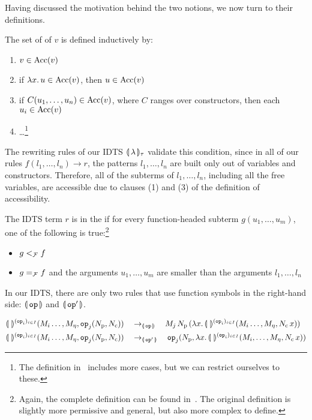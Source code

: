 Having discussed the motivation behind the two notions, we now turn to
their definitions.

\begin{definition}
  The set  of  of $v$ is
  defined inductively by:

  \begin{enumerate}
  \item $v \in \operatorname{Acc}(v)$
  \item if $\lambda x.\, u \in \operatorname{Acc}(v)$, then $u \in \operatorname{Acc}(v)$
  \item if $C(u_1, \ldots, u_n) \in \operatorname{Acc}(v)$, where $C$ ranges over
    constructors, then each $u_i \in \operatorname{Acc}(v)$
  \item \ldots\footnote{The definition in~\cite{blanqui2002inductive}
      includes more cases, but we can restrict ourselves to these.}
  \end{enumerate}
\end{definition}

The rewriting rules of our IDTS ${\llparenthesis \, \lambda \, \rrparenthesis_\tau}$ validate this condition, since in
all of our rules $f(l_1, \ldots, l_n) \to r$, the patterns
$l_1, \ldots, l_n$ are built only out of variables and
constructors. Therefore, all of the subterms of $l_1, \ldots, l_n$,
including all the free variables, are accessible due to clauses (1) and (3)
of the definition of accessibility.

\begin{definition}
  The IDTS term $r$ is in the  if for every function-headed subterm
  $g(u_1, \ldots, u_m)$, one of the following is true:\footnote{Again, the
    complete definition can be found
    in~\cite[p.12]{blanqui2002inductive}. The original definition is
    slightly more permissive and general, but also more complex to define.}

  \begin{itemize}
  \item $g <_{\mathcal{F}} f$
  \item $g =_{\mathcal{F}} f$ and the arguments $u_1, \ldots, u_m$ are smaller than
    the arguments $l_1, \ldots, l_n$
  \end{itemize}
\end{definition}

In our IDTS, there are only two rules that use function symbols in the
right-hand side: $\llparenthesis \, \mathtt{op} \, \rrparenthesis$ and $\llparenthesis \, \mathtt{op}' \, \rrparenthesis$.

\begin{align*}
  \llparenthesis \,  \, \rrparenthesis^{(\mathtt{op}_i)_{i \in I}}(M_i \ldots, M_\eta, \mathtt{op}_j(N_{\mathrm{p}}, N_{\mathrm{c}})) \quad &\to_{\llparenthesis \, \mathtt{op} \, \rrparenthesis} \quad
  M_j\,N_{\mathrm{p}}\,(\lambda x.\, \llparenthesis \,  \, \rrparenthesis^{(\mathtt{op}_i)_{i \in I}}(M_i \ldots, M_\eta, N_{\mathrm{c}}\,x)) \\
  \llparenthesis \,  \, \rrparenthesis^{(\mathtt{op}_i)_{i \in I}}(M_i \ldots, M_\eta, \mathtt{op}_j(N_{\mathrm{p}}, N_{\mathrm{c}})) \quad &\to_{\llparenthesis \, \mathtt{op}' \, \rrparenthesis} \quad
  \mathtt{op}_j(N_{\mathrm{p}}, \lambda x.\, \llparenthesis \,  \, \rrparenthesis^{(\mathtt{op}_i)_{i \in I}}(M_i, \ldots, M_\eta, N_{\mathrm{c}}\,x))
\end{align*}

